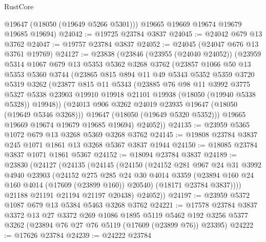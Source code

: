 \begin{lexlean}{RustCore}
\begin{coremodule}
        @19647
        (@18050 (@19649 @5266 @5301)))
      @19665
      @19669
      @19674
      @19679
      @19685
      @19694)
@24042 := @19725 @23784 @3837
@24045 := @24042 @679 @13 @3762
@24047 := @19757 @23784 @3837
@24052 := @24045 (@24047 @676 @13 @3761 @19769)
@24127 := @23838
    (@23846
      (@23955 (@24040 @24052))
      (@23959
        @5314
        @1067
        @679
        @13
        @5353
        @5362
        @3268
        @3762
        (@23857
          @1066
          @50
          @13
          @5353
          @5360
          @3744
          (@23865
            @815
            @894
            @11
            @49
            @5343
            @5352
            @5359
            @3720
            @5319
            @3262
            (@23877
              @815
              @11
              @5343
              (@23885
                @76
                @98
                @11
                @3992
                @3775
                @5327
                @5338
                @23903
                @19910
                @19918
                @21101
                @19938
                (@18050 (@19940 @5338 @5328))
                @19948))
            (@24013 @906 @3262 @24019 @23935 @19647 (@18050 (@19649 @5346 @3268)))
            @19647
            (@18050 (@19649 @5320 @5352)))
          @19665
          @19669
          @19674
          @19679
          @19685
          @19694)
        @24052))
@24135 := @23959 @5365 @1072 @679 @13 @3268 @5369 @3268 @3762
@24145 := @19808 @23784 @3837 @245 @1071 @1861 @13 @3268 @5367 @3837 @1944
@24150 := @18085 @23784 @3837 @1071 @1861 @5367
@24152 := @18094 @23784 @3837
@24189 := @23830
    (@24127
      (@24135
        (@24145
          (@24150
            (@24152
              @281
              @967
              @24
              @31
              @3992
              @4940
              @23903
              (@24152
                @275
                @285
                @24
                @30
                @4014
                @3359
                (@23894 @160 @24 @160 @4014 (@17609 (@23899 @160)) @20540)
                (@18171 @23784 @3837))))
          @21188
          @21191
          @21194
          @21197
          @20438)
        @24052))
@24197 := @23959 @5372 @1087 @679 @13 @5384 @5463 @3268 @3762
@24221 := @17578
    @23784
    @3837
    @3372
    @13
    @27
    @3372
    @269
    @1086
    @1895
    @5119
    @5462
    @192
    @3256
    @5377
    @3262
    (@23894 @76 @27 @76 @5119 (@17609 (@23899 @76)) @23395)
@24222 := @17626 @23784
@24239 := @24222
    @23784

\end{coremodule}
\end{lexlean}

